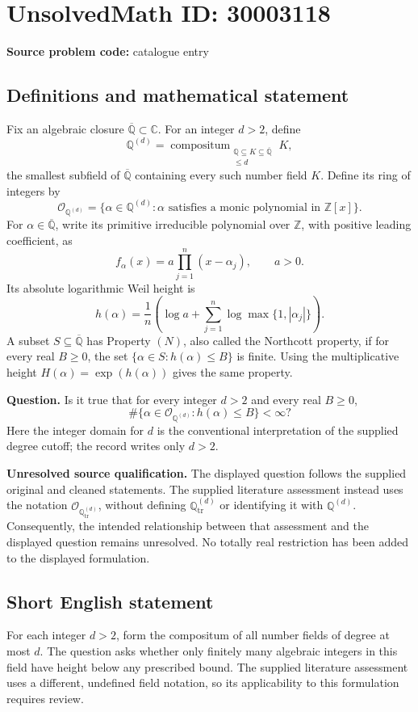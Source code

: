 \documentclass[11pt]{article}
\begin{document}
\section*{UnsolvedMath ID: 30003118}
\textbf{Source problem code:} catalogue entry
\subsection{Definitions and mathematical statement}
Fix an algebraic closure \(\overline{\mathbb Q}\subset\mathbb C\). For an integer \(d>2\), define
\[
\mathbb Q^{(d)}=\mathop{\mathrm{compositum}}_{\substack{\mathbb Q\subseteq K\subseteq\overline{\mathbb Q}\\ [K:\mathbb Q]\le d}}K,
\]
the smallest subfield of \(\overline{\mathbb Q}\) containing every such number field \(K\). Define its ring of integers by
\[
\mathcal O_{\mathbb Q^{(d)}}=\{\alpha\in\mathbb Q^{(d)}:\alpha\text{ satisfies a monic polynomial in }\mathbb Z[x]\}.
\]
For \(\alpha\in\overline{\mathbb Q}\), write its primitive irreducible polynomial over \(\mathbb Z\), with positive leading coefficient, as
\[
f_\alpha(x)=a\prod_{j=1}^{n}(x-\alpha_j),\qquad a>0.
\]
Its absolute logarithmic Weil height is
\[
h(\alpha)=\frac{1}{n}\left(\log a+\sum_{j=1}^{n}\log\max\{1,|\alpha_j|\}\right).
\]
A subset \(S\subseteq\overline{\mathbb Q}\) has Property \((N)\), also called the Northcott property, if for every real \(B\ge0\), the set \(\{\alpha\in S:h(\alpha)\le B\}\) is finite. Using the multiplicative height \(H(\alpha)=\exp(h(\alpha))\) gives the same property.

\textbf{Question.} Is it true that for every integer \(d>2\) and every real \(B\ge0\),
\[
\#\{\alpha\in\mathcal O_{\mathbb Q^{(d)}}:h(\alpha)\le B\}<\infty?
\]
Here the integer domain for \(d\) is the conventional interpretation of the supplied degree cutoff; the record writes only \(d>2\).

\textbf{Unresolved source qualification.} The displayed question follows the supplied original and cleaned statements. The supplied literature assessment instead uses the notation \(\mathcal O_{\mathbb Q_{\mathrm{tr}}^{(d)}}\), without defining \(\mathbb Q_{\mathrm{tr}}^{(d)}\) or identifying it with \(\mathbb Q^{(d)}\). Consequently, the intended relationship between that assessment and the displayed question remains unresolved. No totally real restriction has been added to the displayed formulation.
\subsection{Short English statement}
For each integer \(d>2\), form the compositum of all number fields of degree at most \(d\). The question asks whether only finitely many algebraic integers in this field have height below any prescribed bound. The supplied literature assessment uses a different, undefined field notation, so its applicability to this formulation requires review.
\end{document}
